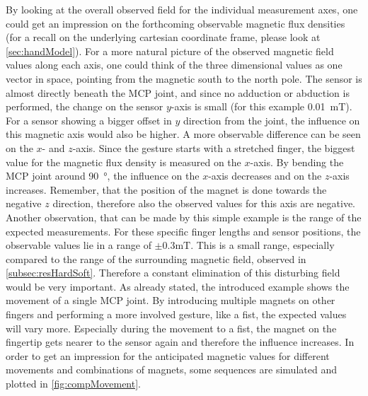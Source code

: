 By looking at the overall observed field for the individual measurement axes, one could get an impression on the forthcoming observable magnetic flux densities (for a recall on the underlying cartesian coordinate frame, please look at \ref{sec:handModel}). For a more natural picture of the observed magnetic field values along each axis, one could think of the three dimensional values as one vector in space, pointing from the magnetic south to the north pole. The sensor is almost directly beneath the \ac{MCP} joint, and since no adduction or abduction is performed, the change on the sensor $ y $-axis is small (for this example \SI{0.01}{\milli \tesla}). For a sensor showing a bigger offset in $ y $ direction from the joint, the influence on this magnetic axis would also be higher. A more observable difference can be seen on the $ x $- and $ z $-axis. Since the gesture starts with a stretched finger, the biggest value for the magnetic flux density is measured on the $ x $-axis. By bending the \ac{MCP} joint around \SI{90}{\degree}, the influence on the $ x $-axis decreases and on the $ z $-axis increases. Remember, that the position of the magnet is done towards the negative $ z $ direction, therefore also the observed values for this axis are negative. Another observation, that can be made by this simple example is the range of the expected measurements. For these specific finger lengths and sensor positions, the observable values lie in a range of $ \pm 0.3\si{\milli \tesla} $. This is a small range, especially compared to the range of the surrounding magnetic field, observed in \ref{subsec:resHardSoft}. Therefore a constant elimination of this disturbing field would be very important. As already stated, the introduced example shows the movement of a single \ac{MCP} joint. By introducing multiple magnets on other fingers and performing a more involved gesture, like a fist, the expected values will vary more. Especially during the movement to a fist, the magnet on the fingertip gets nearer to the sensor again and therefore the influence increases. In order to get an impression for the anticipated magnetic values for different movements and combinations of magnets, some sequences are simulated and plotted in \ref{fig:compMovement}.
